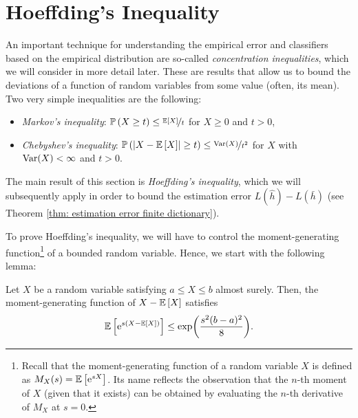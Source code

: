 \section{Hoeffding's Inequality}

An important technique for understanding the empirical error and classifiers based on the empirical distribution are so-called \emph{concentration inequalities}, which we will consider in more detail later. These are results that allow us to bound the deviations of a function of random variables from some value (often, its mean). Two very simple inequalities are the following:

\begin{prop}
\begin{itemize}
    \item \emph{Markov's inequality}: $\mathbb{P}\left(X \geq t\right) \leq \nicefrac{\mathbb{E}\left[X\right]}{t}$ for $X \geq 0$ and $t > 0$,

    \item \emph{Chebyshev’s inequality}: $\mathbb{P}\left(\abs{X - \mathbb{E}\left[X\right]} \geq t\right) \leq \nicefrac{\mathrm{Var}(X)}{t^2}$ for $X$ with $\mathrm{Var}(X) < \infty$ and $t > 0$.
\end{itemize}
\end{prop}

\noindent The main result of this section is \emph{Hoeffding's inequality}, which we will subsequently apply in order to bound the estimation error $L(\hat h) - L(\bar h)$ (see Theorem \ref{thm: estimation error finite dictionary}).

To prove Hoeffding's inequality, we will have to control the moment-generating function\footnote{Recall that the moment-generating function of a random variable $X$ is defined as $M_X(s) = \mathbb{E}\left[\mathrm{e}^{sX}\right]$. Its name reflects the observation that the $n$-th moment of $X$ (given that it exists) can be obtained by evaluating the $n$-th derivative of $M_X$ at $s=0$.} of a bounded random variable. Hence, we start with the following lemma:

\begin{lemma}
\label{lem: hoeffding}
Let $X$ be a random variable satisfying $a \leq X \leq b$ almost surely. Then, 
the moment-generating function of $X - \mathbb{E}\left[X\right]$ satisfies
\[
    \mathbb{E}\left[\mathrm{e}^{s(X - \mathbb{E}\left[X\right])}\right] \leq \exp(\frac{s^2(b-a)^2}{8}).
\]
\end{lemma}

